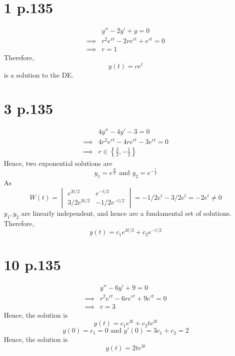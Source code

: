 \documentclass[11pt]{article}
\begin{document}
\section*{1 p.135}
\begin{equation*}
    \begin{aligned}
        &y'' - 2y' + y= 0 \\
        \implies &r^2 e^{rt} - 2re^{rt} + e^{rt} = 0 \\
        \implies &r = 1
    \end{aligned}
\end{equation*}
Therefore, 
\[
    y(t) =ce^{t}    
\]
is a solution to the DE.
\newpage
\section*{3 p.135}
\begin{equation*}
    \begin{aligned}
        &4y'' - 4y' - 3 = 0 \\
        \implies &4r^2 e^{rt} - 4re^{rt} - 3e^{rt} = 0 \\
        \implies &r \in \left\{\frac{3}{2},-\frac{1}{2}\right\} 
    \end{aligned}
\end{equation*}
Hence, two exponential solutions are 
\[
    y_1 = e^{\frac{3t}{2}} \text{ and } y_2 = e^{-\frac{t}{2}}    
\]
As 
\[ 
    W(t) = 
    \begin{vmatrix}
        e^{3t/2} & e^{-t/2} \\
        3/2e^{3t/2} & -1/2e^{-t/2} 
    \end{vmatrix}
    = -1/2 e^t - 3/2e^t = -2e^t \ne 0
\]
$y_1,y_2$ are linearly independent, and hence are a fundamental set of solutions. 
Therefore,
\[
    y(t) = c_1e^{3t/2} + c_2e^{-t/2}    
\]
\newpage
\section*{10 p.135}
\begin{equation*}
    \begin{aligned}
        &y'' - 6y' + 9 = 0 \\
        \implies &r^2 e^{rt} - 6re^{rt} + 9e^{rt}= 0 \\
        \implies &r = 3
    \end{aligned}
\end{equation*}
Hence, the solution is 
\[
    y(t) = c_1 e^{3t} + c_2 te^{3t}    
\]
\[
    y(0) = c_1  = 0 \text{ and } y'(0) = 3c_1 + c_2= 2
\]
Hence, the solution is 
\[
    y(t) =  2te^{3t}    
\]
\newpage
\end{document}
